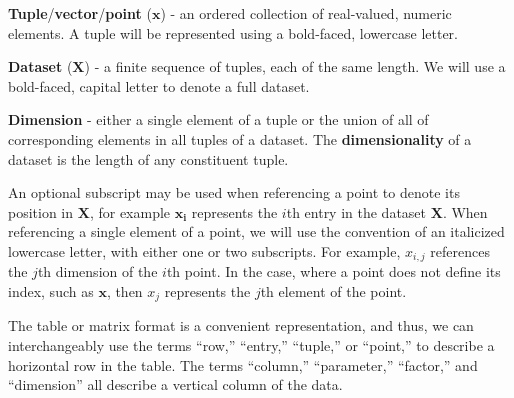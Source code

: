 \begin{defn}
  \textbf{Tuple}/\textbf{vector}/\textbf{point} ($\mathbf{x}$) - an ordered collection of real-valued, numeric elements. A tuple will be represented using a bold-faced, lowercase letter.
\end{defn}

\begin{defn}
  \textbf{Dataset} ($\mathbf{X}$) - a finite sequence of tuples, each of the
  same length. We will use a bold-faced, capital letter to denote a full dataset.
\end{defn}

\begin{defn}
  \textbf{Dimension} - either a single element of a tuple or the
  union of all of corresponding elements in all tuples of a dataset.
  The \textbf{dimensionality} of a dataset is the length of any constituent
  tuple.
\end{defn}

An optional subscript may be used when referencing a point to denote its position in $\mathbf{X}$, for example $\mathbf{x_i}$ represents the $i$th entry in the dataset $\mathbf{X}$.
%
When referencing a single element of a point, we will use the convention of an italicized lowercase letter, with either one or two subscripts.
%
For example, $x_{i,j}$ references the $j$th dimension of the $i$th point.
%
In the case, where a point does not define its index, such as $\mathbf{x}$, then $x_j$ represents the $j$th element of the point.

The table or matrix format is a convenient representation, and thus, we can interchangeably use the terms ``row,'' ``entry,'' ``tuple,'' or ``point,'' to describe a horizontal row in the table.
%
The terms ``column,'' ``parameter,'' ``factor,'' and ``dimension'' all describe a vertical column of the data.

